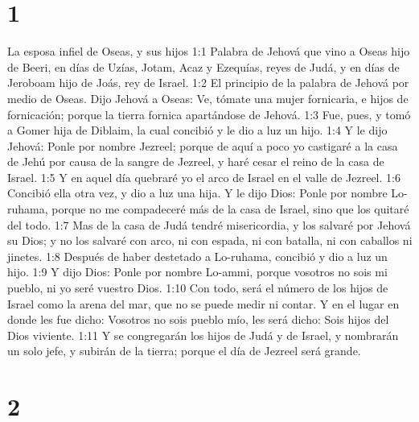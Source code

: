 
\chapter{1}

La esposa infiel de Oseas, y sus hijos  
1:1 Palabra de Jehová que vino a Oseas hijo de Beeri, en días de Uzías,  Jotam, Acaz y Ezequías, reyes de Judá, y en días de Jeroboam hijo de Joás, rey de Israel.  
1:2 El principio de la palabra de Jehová por medio de Oseas. Dijo Jehová a Oseas: Ve, tómate una mujer fornicaria, e hijos de fornicación; porque la tierra fornica apartándose de Jehová.  
1:3 Fue, pues, y tomó a Gomer hija de Diblaim, la cual concibió y le dio a luz un hijo.  
1:4 Y le dijo Jehová: Ponle por nombre Jezreel; porque de aquí a poco yo castigaré a la casa de Jehú por causa de la sangre de Jezreel, y haré cesar el reino de la casa de Israel.  
1:5 Y en aquel día quebraré yo el arco de Israel en el valle de Jezreel.  
1:6 Concibió ella otra vez, y dio a luz una hija. Y le dijo Dios: Ponle por nombre Lo-ruhama, porque no me compadeceré más de la casa de Israel, sino que los quitaré del todo.  
1:7 Mas de la casa de Judá tendré misericordia, y los salvaré por Jehová su Dios; y no los salvaré con arco, ni con espada, ni con batalla, ni con caballos ni jinetes. 
1:8 Después de haber destetado a Lo-ruhama, concibió y dio a luz un hijo.  
1:9 Y dijo Dios: Ponle por nombre Lo-ammi, porque vosotros no sois mi pueblo, ni yo seré vuestro Dios.  
1:10 Con todo, será el número de los hijos de Israel como la arena del mar, que no se puede medir ni contar. Y en el lugar en donde les fue dicho: Vosotros no sois pueblo mío, les será dicho: Sois hijos del Dios viviente. 
1:11 Y se congregarán los hijos de Judá y de Israel, y nombrarán un solo jefe, y subirán de la tierra; porque el día de Jezreel será grande.  

\chapter{2}

